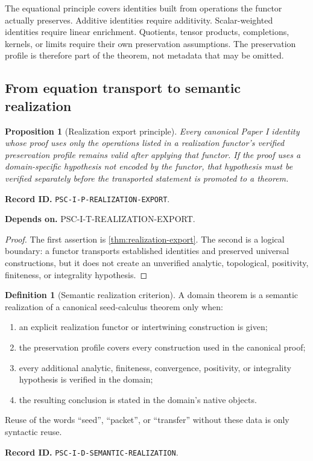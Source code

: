 \documentclass[11pt]{article}
\newtheorem{proposition}[proposition]{Proposition}
\theoremstyle{definition}
\newtheorem{definition}[definition]{Definition}
\theoremstyle{remark}
\newcommand{\RecordID}[1]{\par\smallskip\noindent\begingroup\footnotesize\color{PSCGray}\raggedright\textbf{Record ID.} \nolinkurl{#1}.\par\endgroup}
\newcommand{\Depends}[1]{\par\noindent\begingroup\footnotesize\color{PSCGray}\raggedright\textbf{Depends on.} #1\par\endgroup}
\begin{document}
\begin{interpretation}
The equational principle covers identities built from operations the functor actually preserves.  Additive identities require additivity.  Scalar-weighted identities require linear enrichment.  Quotients, tensor products, completions, kernels, or limits require their own preservation assumptions.  The preservation profile is therefore part of the theorem, not metadata that may be omitted.
\end{interpretation}


\subsection{From equation transport to semantic realization}
\begin{proposition}[Realization export principle]
\label{prop:realization-export}
Every canonical Paper I identity whose proof uses only the operations listed in a realization functor's verified preservation profile remains valid after applying that functor.  If the proof uses a domain-specific hypothesis not encoded by the functor, that hypothesis must be verified separately before the transported statement is promoted to a theorem.
\end{proposition}
\RecordID{PSC-I-P-REALIZATION-EXPORT}
\Depends{PSC-I-T-REALIZATION-EXPORT.}

\begin{proof}
The first assertion is \cref{thm:realization-export}.  The second is a logical boundary: a functor transports established identities and preserved universal constructions, but it does not create an unverified analytic, topological, positivity, finiteness, or integrality hypothesis.
\end{proof}

\begin{definition}[Semantic realization criterion]
\label{def:semantic-realization}
A domain theorem is a semantic realization of a canonical seed-calculus theorem only when:
\begin{enumerate}[label=(\roman*)]
\item an explicit realization functor or intertwining construction is given;
\item the preservation profile covers every construction used in the canonical proof;
\item every additional analytic, finiteness, convergence, positivity, or integrality hypothesis is verified in the domain;
\item the resulting conclusion is stated in the domain's native objects.
\end{enumerate}
Reuse of the words ``seed'', ``packet'', or ``transfer'' without these data is only syntactic reuse.
\end{definition}
\RecordID{PSC-I-D-SEMANTIC-REALIZATION}
\end{document}

